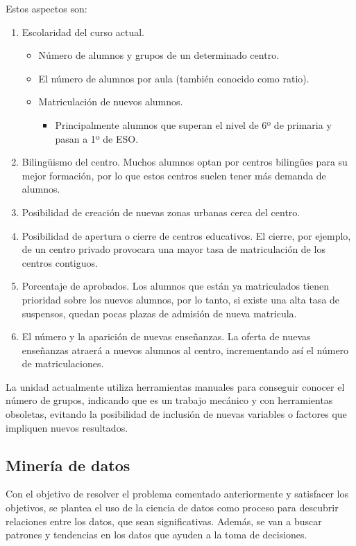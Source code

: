 Estos aspectos son:
\begin{enumerate}
	\item Escolaridad del curso actual.
	\begin{itemize}
		\item Número de alumnos y grupos de un determinado centro.
		\item El número de alumnos por aula (también conocido como ratio).
		\item Matriculación de nuevos alumnos.
		\begin{itemize}
			\item Principalmente alumnos que superan el nivel de 6º de primaria y pasan a 1º de ESO.
		\end{itemize}
	\end{itemize}
	
	\item Bilingüismo del centro. Muchos alumnos optan por centros bilingües para su mejor formación, por lo que estos centros suelen tener más demanda de alumnos.
	\item Posibilidad de creación de nuevas zonas urbanas cerca del centro. 
	\item Posibilidad de apertura o cierre de centros educativos. El cierre, por ejemplo, de un centro privado provocara una mayor tasa de matriculación de los centros contiguos. 
	\item Porcentaje de aprobados. Los alumnos que están ya matriculados tienen prioridad sobre los nuevos alumnos, por lo tanto, si existe una alta tasa de suspensos, quedan pocas plazas de admisión de nueva matricula.
	\item El número y la aparición de nuevas enseñanzas. La oferta de nuevas enseñanzas atraerá a nuevos alumnos al centro, incrementando así el número de matriculaciones.
\end{enumerate}

La unidad actualmente utiliza herramientas manuales para conseguir conocer el número de grupos, indicando que es un trabajo mecánico y con herramientas obsoletas, evitando la posibilidad de inclusión de nuevas variables o factores que impliquen nuevos resultados.

\subsection{Minería de datos}
Con el objetivo de resolver el problema comentado anteriormente y satisfacer los objetivos, se plantea el uso de la ciencia de datos como proceso para descubrir relaciones entre los datos, que sean significativas. Además, se van a buscar patrones y tendencias en los datos que ayuden a la toma de decisiones.

